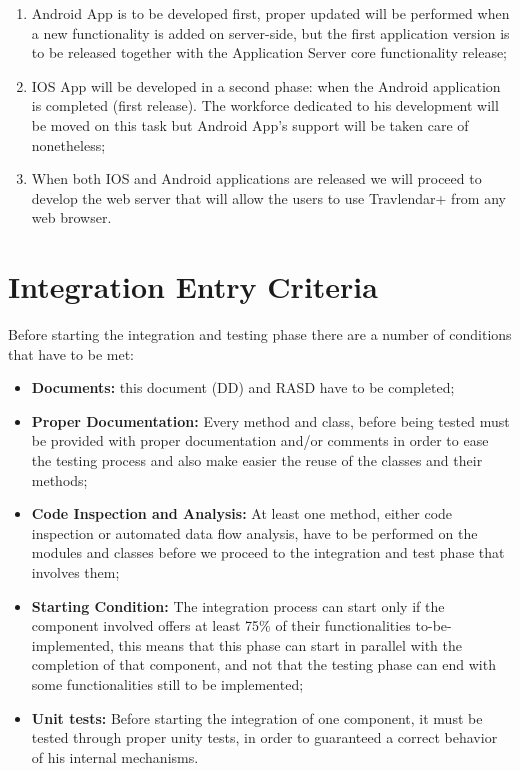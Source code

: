 \begin{enumerate}
\item Android App is to be developed first, proper updated will be performed when a new functionality is added on server-side, but the first application version is to be released together with the Application Server core functionality release;
\item IOS App will be developed in a second phase: when the Android application is completed (first release). The workforce dedicated to his development will be moved on this task but Android App's support will be taken care of nonetheless;
\item When both IOS and Android applications are released we will proceed to develop the web server that will allow the users to use Travlendar+ from any web browser.
\end{enumerate}

\section{Integration Entry Criteria}
Before starting the integration and testing phase there are a number of conditions that have to be met:
\begin{itemize}
\item \textbf{Documents:} this document (DD) and RASD have to be completed;
\item \textbf{Proper Documentation:} Every method and class, before being tested must be provided with proper documentation and/or comments in order to ease the testing process and also make easier the reuse of the classes and their methods;
\item \textbf{Code Inspection and Analysis:} At least one method, either code inspection or automated data flow analysis, have to be performed on the modules and classes before we proceed to the integration and test phase that involves them;
\item \textbf{Starting Condition:} The integration process can start only if the component involved offers at least 75\% of their functionalities to-be-implemented, this means that this phase can start in parallel with the completion of that component, and not that the testing phase can end with some functionalities still to be implemented; 
\item \textbf{Unit tests:} Before starting the integration of one component, it must be tested through proper unity tests, in order to guaranteed a correct behavior of his internal mechanisms.
\end{itemize}

